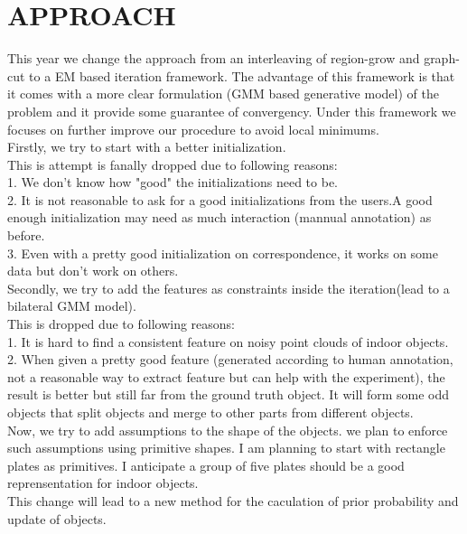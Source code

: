\documentclass{onrannual}
\begin{document}
\section{APPROACH}
This year we change the approach from an interleaving of region-grow and graph-cut to a EM based iteration framework. The advantage of this framework is that it comes with a more clear formulation (GMM based generative model) of the problem and it provide some guarantee of convergency. Under this framework we focuses on further improve our procedure to avoid local minimums.\\
Firstly, we try to start with a better initialization.\\
This is attempt is fanally dropped due to following reasons:\\
1. We don't know how "good" the initializations need to be.\\
2. It is not reasonable to ask for a good initializations from the users.A good enough initialization may need as much interaction (mannual annotation) as before.\\
3. Even with a pretty good initialization on correspondence, it works on some data but don't work on others.\\
Secondly, we try to add the features as constraints inside the iteration(lead to a bilateral GMM model).\\
This is dropped due to following reasons:\\
1. It is hard to find a consistent feature on noisy point clouds of indoor objects.\\
2. When given a pretty good feature (generated according to human annotation, not a reasonable way to extract feature but can help with the experiment), the result is better but still far from the ground truth object. It will form some odd objects that split objects and merge to other parts from different objects.\\
Now, we try to add assumptions to the shape of the objects. we plan to enforce such assumptions using primitive shapes.
I am planning to start with rectangle plates as primitives. I anticipate a group of five plates should be a good reprensentation for indoor objects.\\
This change will lead to a new method for the caculation of prior probability and update of objects.
\end{document}
